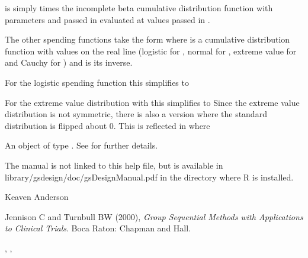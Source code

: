 \begin{Details}\relax
{} is simply  times the incomplete beta cumulative distribution 
function with parameters
 and  passed in  evaluated at values passed in . 

The other spending functions take the form
where  is a cumulative distribution function with values  on the real line (logistic for , 
normal for , extreme value for  and Cauchy for ) and
 is its inverse.

For the logistic spending function this simplifies to

For the extreme value distribution with  this simplifies to 
Since the extreme value distribution is not symmetric, there is also a version
where the standard distribution is flipped about 0. This is reflected in  where
\end{Details}
\begin{Value}
An object of type . See  for further details.
\end{Value}
\begin{Note}\relax
The manual is not linked to this help file, but is available in library/gsdesign/doc/gsDesignManual.pdf
in the directory where R is installed.
\end{Note}
\begin{Author}\relax
Keaven Anderson 
\end{Author}
\begin{References}\relax
Jennison C and Turnbull BW (2000), \emph{Group Sequential Methods with Applications to Clinical Trials}.
Boca Raton: Chapman and Hall.
\end{References}
\begin{SeeAlso}\relax
{}, , 
\end{SeeAlso}
